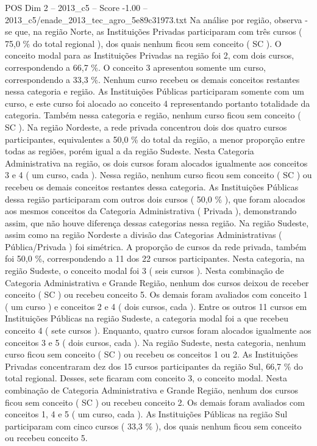 \begin{textsample}{POS Dim 2 – 2013\_c5 – Score -1.00 – 2013\_c5/enade\_2013\_tec\_agro\_5e89c31973.txt}
Na análise por região, observa -se que, na região Norte, as Instituições Privadas participaram com três cursos ( 75,0 \% do total regional ), dos quais nenhum ficou sem conceito ( SC ).
O conceito modal para as Instituições Privadas na região foi 2, com dois cursos, correspondendo a 66,7 \%.
O conceito 3 apresentou somente um curso, correspondendo a 33,3 \%.
Nenhum curso recebeu os demais conceitos restantes nessa categoria e região.
As Instituições Públicas participaram somente com um curso, e este curso foi alocado ao conceito 4 representando portanto totalidade da categoria.
Também nessa categoria e região, nenhum curso ficou sem conceito ( SC ).
Na região Nordeste, a rede privada concentrou dois dos quatro cursos participantes, equivalentes a 50,0 \% do total da região, a menor proporção entre todas as regiões, porém igual a da região Sudeste.
Nesta Categoria Administrativa na região, os dois cursos foram alocados igualmente aos conceitos 3 e 4 ( um curso, cada ).
Nessa região, nenhum curso ficou sem conceito ( SC ) ou recebeu os demais conceitos restantes dessa categoria.
As Instituições Públicas dessa região participaram com outros dois cursos ( 50,0 \% ), que foram alocados aos mesmos conceitos da Categoria Administrativa ( Privada ), demonstrando assim, que não houve diferença dessas categorias nessa região.
Na região Sudeste, assim como na região Nordeste a divisão das Categorias Administrativas ( Pública/Privada ) foi simétrica.
A proporção de cursos da rede privada, também foi 50,0 \%, correspondendo a 11 dos 22 cursos participantes.
Nesta categoria, na região Sudeste, o conceito modal foi 3 ( seis cursos ).
Nesta combinação de Categoria Administrativa e Grande Região, nenhum dos cursos deixou de receber conceito ( SC ) ou recebeu conceito 5.
Os demais foram avaliados com conceito 1 ( um curso ) e conceitos 2 e 4 ( dois cursos, cada ).
Entre os outros 11 cursos em Instituições Públicas na região Sudeste, a categoria modal foi a que recebeu conceito 4 ( sete cursos ).
Enquanto, quatro cursos foram alocados igualmente aos conceitos 3 e 5 ( dois cursos, cada ).
Na região Sudeste, nesta categoria, nenhum curso ficou sem conceito ( SC ) ou recebeu os conceitos 1 ou 2.
As Instituições Privadas concentraram dez dos 15 cursos participantes da região Sul, 66,7 \% do total regional.
Desses, sete ficaram com conceito 3, o conceito modal.
Nesta combinação de Categoria Administrativa e Grande Região, nenhum dos cursos ficou sem conceito ( SC ) ou recebeu conceito 2.
Os demais foram avaliados com conceitos 1, 4 e 5 ( um curso, cada ).
As Instituições Públicas na região Sul participaram com cinco cursos ( 33,3 \% ), dos quais nenhum ficou sem conceito ou recebeu conceito 5.

\end{textsample}
